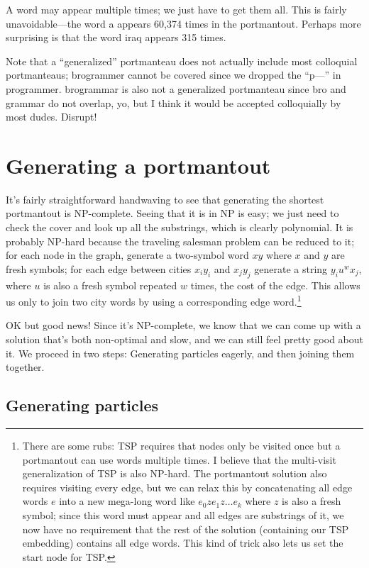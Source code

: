 \documentclass{article}
\begin{document}
A word may appear multiple times; we just have to get them all. This
is fairly unavoidable---the word {\sf a} appears
60,374 times
in the portmantout. Perhaps more surprising is that the word {\sf
  iraq} appears
315 times.


Note that a ``generalized'' portmanteau does not actually include most
colloquial portmanteaus; {\sf brogrammer} cannot be covered since we
dropped the ``p---'' in {\sf programmer}. {\sf brogrammar} is also not
a generalized portmanteau since {\sf bro} and {\sf grammar} do not
overlap, yo, but I think it would be accepted colloquially by most
dudes. Disrupt!

\section{Generating a portmantout}

It's fairly straightforward handwaving to see that generating the
shortest portmantout is NP-complete. Seeing that it is in NP is easy;
we just need to check the cover and look up all the substrings, which
is clearly polynomial. It is probably NP-hard because the traveling
salesman problem can be reduced to it; for each node in the graph,
generate a two-symbol word $xy$ where $x$ and $y$ are fresh symbols;
for each edge between cities $x_iy_i$ and $x_jy_j$ generate a string
$y_iu^{w}x_j$, where $u$ is also a fresh symbol repeated $w$ times,
the cost of the edge. This allows us only to join two city words by
using a corresponding edge word.\footnote{There are some rubs: TSP
  requires that nodes only be visited once but a portmantout can use
  words multiple times. I believe that the multi-visit generalization
  of TSP is also NP-hard. The portmantout solution also requires visiting
  every edge, but we can relax this by concatenating all edge words $e$ into a
  new mega-long word like $e_0 z e_1 z \ldots e_k$ where $z$ is also
  a fresh symbol; since this word must appear and all edges are substrings
  of it, we now have no requirement that the rest of the solution (containing
  our TSP embedding) contains all edge words. This kind of trick also lets us
  set the start node for TSP.}

OK but good news! Since it's NP-complete, we know that we can come up
with a solution that's both non-optimal and slow, and we can still
feel pretty good about it. We proceed in two steps: Generating
particles eagerly, and then joining them together.

\subsection{Generating particles} \label{sec:gen}
\end{document}
